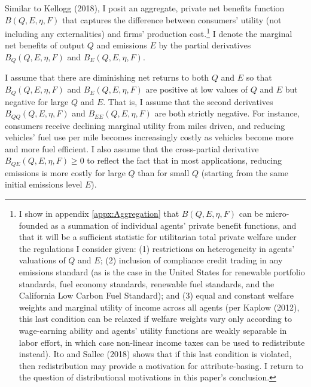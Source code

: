 \documentclass[12pt]{article}
\begin{document}
Similar to Kellogg (2018), I posit an aggregate, private net benefits function $B(Q,E,\eta,F)$ that captures the difference between consumers' utility (not including any externalities) and firms' production cost.\footnote{I show in appendix \ref{appx:Aggregation} that $B(Q,E,\eta,F)$ can be micro-founded as a summation of individual agents' private benefit functions, and that it will be a sufficient statistic for utilitarian total private welfare under the regulations I consider given: (1) restrictions on heterogeneity in agents' valuations of $Q$ and $E$; (2) inclusion of compliance credit trading in any emissions standard (as is the case in the United States for renewable portfolio standards, fuel economy standards, renewable fuel standards, and the California Low Carbon Fuel Standard); and (3) equal and constant welfare weights and marginal utility of income across all agents (per Kaplow (2012), this last condition can be relaxed if welfare weights vary only according to wage-earning ability and agents' utility functions are weakly separable in labor effort, in which case non-linear income taxes can be used to redistribute instead). Ito and Sallee (2018) shows that if this last condition is violated, then redistribution may provide a motivation for attribute-basing. I return to the question of distributional motivations in this paper's conclusion.} I denote the marginal net benefits of output $Q$ and emissions $E$ by the partial derivatives $B_Q(Q,E,\eta,F)$ and $B_E(Q,E,\eta,F)$. 

I assume that there are diminishing net returns to both $Q$ and $E$ so that $B_Q(Q,E,\eta,F)$ and $B_E(Q,E,\eta,F)$ are positive at low values of $Q$ and $E$ but negative for large $Q$ and $E$. That is, I assume that the second derivatives $B_{QQ}(Q,E,\eta,F)$ and $B_{EE}(Q,E,\eta,F)$ are both strictly negative. For instance, consumers receive declining marginal utility from miles driven, and reducing vehicles' fuel use per mile becomes increasingly costly as vehicles become more and more fuel efficient. I also assume that the cross-partial derivative $B_{QE}(Q,E,\eta,F)\geq0$ to reflect the fact that in most applications, reducing emissions is more costly for large $Q$ than for small $Q$ (starting from the same initial emissions level $E$).
\end{document}
